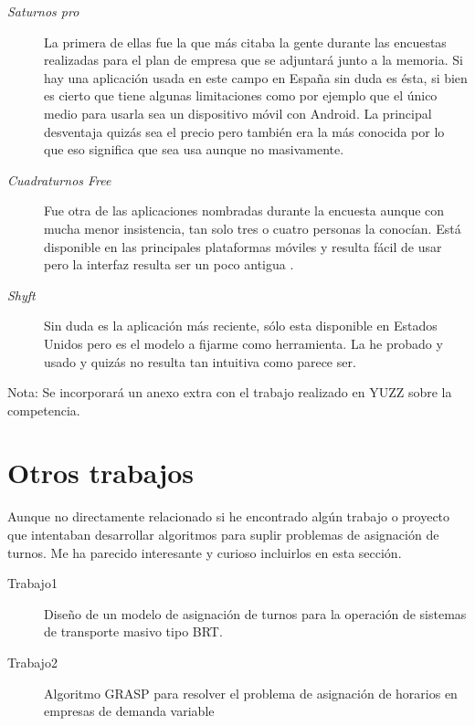 \begin{description}
	\item[\emph{Saturnos pro}] La primera de ellas fue la que más citaba la gente durante las encuestas realizadas para el plan de empresa que se adjuntará junto a la memoria. Si hay una aplicación usada en este campo en España sin duda es ésta, si bien es cierto que tiene algunas limitaciones como por ejemplo que el único medio para usarla sea un dispositivo móvil con Android. La principal desventaja quizás sea el precio pero también era la más conocida por lo que eso significa que sea usa aunque no masivamente.
	\item[\emph{Cuadraturnos Free}] Fue otra de las aplicaciones nombradas durante la encuesta aunque con mucha menor insistencia, tan solo tres o cuatro personas la conocían. Está disponible en las principales plataformas móviles y resulta fácil de usar pero la interfaz resulta ser un poco antigua .
	\item[\emph{Shyft}] Sin duda es la aplicación más reciente, sólo esta disponible en Estados Unidos pero es el modelo a fijarme como herramienta. La he probado y usado y quizás no resulta tan intuitiva como parece ser.
\end{description}

Nota: Se incorporará un anexo extra con el trabajo realizado en YUZZ sobre la competencia. 

\section{Otros trabajos}
Aunque no directamente relacionado si he encontrado algún trabajo o proyecto que intentaban desarrollar algoritmos para suplir problemas de asignación de turnos. Me ha parecido interesante y curioso incluirlos en esta sección.

    \begin{description}
	\item[Trabajo1] Diseño de un modelo de asignación de turnos para la operación
de sistemas de transporte masivo tipo BRT.\cite{trabajo1}
	\item[Trabajo2]Algoritmo GRASP \citep{grasp} para resolver el problema de asignación de horarios en empresas de demanda variable \citep{trabajo2}
\end{description}

